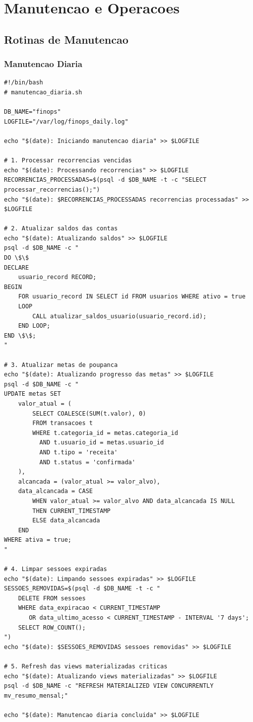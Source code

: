 \section{Manutencao e Operacoes}

\subsection{Rotinas de Manutencao}

\subsubsection{Manutencao Diaria}

\begin{lstlisting}[caption=Script de manutencao diaria]
#!/bin/bash
# manutencao_diaria.sh

DB_NAME="finops"
LOGFILE="/var/log/finops_daily.log"

echo "$(date): Iniciando manutencao diaria" >> $LOGFILE

# 1. Processar recorrencias vencidas
echo "$(date): Processando recorrencias" >> $LOGFILE
RECORRENCIAS_PROCESSADAS=$(psql -d $DB_NAME -t -c "SELECT processar_recorrencias();")
echo "$(date): $RECORRENCIAS_PROCESSADAS recorrencias processadas" >> $LOGFILE

# 2. Atualizar saldos das contas
echo "$(date): Atualizando saldos" >> $LOGFILE
psql -d $DB_NAME -c "
DO \$\$
DECLARE
    usuario_record RECORD;
BEGIN
    FOR usuario_record IN SELECT id FROM usuarios WHERE ativo = true
    LOOP
        CALL atualizar_saldos_usuario(usuario_record.id);
    END LOOP;
END \$\$;
"

# 3. Atualizar metas de poupanca
echo "$(date): Atualizando progresso das metas" >> $LOGFILE
psql -d $DB_NAME -c "
UPDATE metas SET 
    valor_atual = (
        SELECT COALESCE(SUM(t.valor), 0)
        FROM transacoes t
        WHERE t.categoria_id = metas.categoria_id
          AND t.usuario_id = metas.usuario_id
          AND t.tipo = 'receita'
          AND t.status = 'confirmada'
    ),
    alcancada = (valor_atual >= valor_alvo),
    data_alcancada = CASE 
        WHEN valor_atual >= valor_alvo AND data_alcancada IS NULL 
        THEN CURRENT_TIMESTAMP 
        ELSE data_alcancada 
    END
WHERE ativa = true;
"

# 4. Limpar sessoes expiradas
echo "$(date): Limpando sessoes expiradas" >> $LOGFILE
SESSOES_REMOVIDAS=$(psql -d $DB_NAME -t -c "
    DELETE FROM sessoes 
    WHERE data_expiracao < CURRENT_TIMESTAMP 
       OR data_ultimo_acesso < CURRENT_TIMESTAMP - INTERVAL '7 days';
    SELECT ROW_COUNT();
")
echo "$(date): $SESSOES_REMOVIDAS sessoes removidas" >> $LOGFILE

# 5. Refresh das views materializadas criticas
echo "$(date): Atualizando views materializadas" >> $LOGFILE
psql -d $DB_NAME -c "REFRESH MATERIALIZED VIEW CONCURRENTLY mv_resumo_mensal;"

echo "$(date): Manutencao diaria concluida" >> $LOGFILE
\end{lstlisting}

